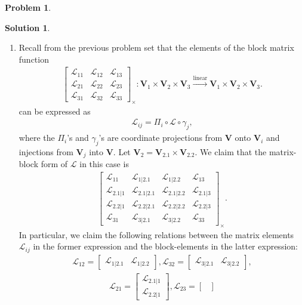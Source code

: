 \documentclass{article}
\theoremstyle{definition}
\newtheorem*{prob*}{Problem}
\newtheorem*{sln*}{Solution}
\newcommand{\V}{\mathbf{V}}
\newcommand{\lag}{\mathcal{L}}
\newcommand{\lin}{\overset{\text{linear}}{\longrightarrow}}
\begin{document}
\begin{prob*}
\begin{sln*}
	$\,$
	\begin{enumerate}
		\item Recall from the previous problem set that the elements of the block matrix function 
		\begin{align*}
		\begin{bmatrix}
		\lag_{11} & \lag_{12} & \lag_{13}\\
		\lag_{21} & \lag_{22} & \lag_{23}\\
		\lag_{31} & \lag_{32} & \lag_{33}
		\end{bmatrix}_\times : \V_1\times \V_2 \times \V_3 \lin \V_1\times \V_2\times \V_3.
		\end{align*}
		can be expressed as
		\begin{align*}
		\lag_{ij} = \Pi_i \circ \lag \circ \gamma_j,
		\end{align*}
		where the $\Pi_i$'s and $\gamma_j$'s are coordinate projections from $\V$ onto $\V_i$ and injections from $\V_j$ into $\V$. Let $\V_2 = \V_{2.1} \times \V_{2.2}$. We claim that the matrix-block form of $\lag$ in this case is
		\begin{align*}
		\begin{bmatrix}
		\lag_{11} & \lag_{1|2.1} & \lag_{1|2.2} & \lag_{13}\\
		\lag_{2.1|1} & \lag_{2.1|2.1} & \lag_{2.1|2.2} & \lag_{2.1|3}\\
		\lag_{2.2|1} & \lag_{2.2|2.1} & \lag_{2.2|2.2} & \lag_{2.2|3}\\
		\lag_{31} & \lag_{3|2.1} & \lag_{3|2.2} & \lag_{33}
		\end{bmatrix}_\times.
		\end{align*}
		In particular, we claim the following relations between the matrix elements $\lag_{ij}$ in the former expression and the block-elements in the latter expression: 
		\begin{align*}
		\lag_{12} = \begin{bmatrix}
		\lag_{1|2.1}&\lag_{1|2.2}
		\end{bmatrix}, \lag_{32} = \begin{bmatrix}
		\lag_{3|2.1}&\lag_{3|2.2}
		\end{bmatrix}, 
		\end{align*}
		\begin{align*}
		\lag_{21} = \begin{bmatrix}
		\lag_{2.1|1}\\ \lag_{2.2|1}
		\end{bmatrix}, \lag_{23} = \begin{bmatrix}

\end{bmatrix}
\end{align*}
\end{enumerate}
\end{sln*}
\end{prob*}
\end{document}
